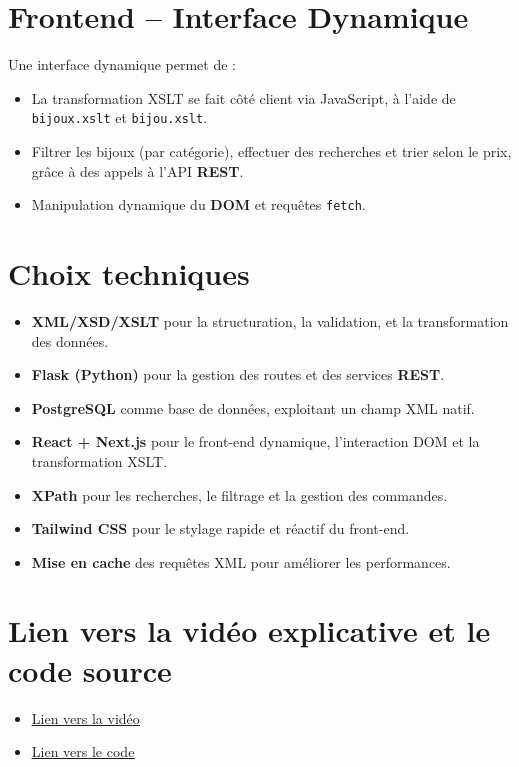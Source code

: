 \documentclass[14pt]{extarticle}
\begin{document}
\section*{Frontend – Interface Dynamique}
Une interface dynamique permet de :
\begin{itemize}[label=-]
    \item La transformation XSLT se fait côté client via JavaScript, à l’aide de \texttt{bijoux.xslt} et \texttt{bijou.xslt}.
    \item Filtrer les bijoux (par catégorie), effectuer des recherches et trier selon le prix, grâce à des appels à l’API \textbf{REST}.
    \item Manipulation dynamique du \textbf{DOM} et requêtes \texttt{fetch}.
\end{itemize}
\section*{Choix techniques}
\begin{itemize} [label =-]
    \item \textbf{XML/XSD/XSLT} pour la structuration, la validation, et la transformation des données.
    \item \textbf{Flask (Python)} pour la gestion des routes et des services \textbf{REST}.
    \item \textbf{PostgreSQL} comme base de données, exploitant un champ XML natif.
    \item \textbf{React + Next.js} pour le front-end dynamique, l’interaction DOM et la transformation XSLT.
     \item \textbf{XPath} pour les recherches, le filtrage et la gestion des commandes.
     \item \textbf{Tailwind CSS} pour le stylage rapide et réactif du front-end.
     \item \textbf{Mise en cache} des requêtes XML pour améliorer les performances.
\end{itemize}
\section*{ Lien vers la vidéo explicative et le code source}
\begin{itemize}[label= ]
    \item\href{https://drive.google.com/file/d/1js70yp9zMGgbiwFzuWCpGEhvx22dAf4N/view?usp=share_link}{\uline{Lien vers la vidéo}}
    \item \href{https://github.com/ikrammedj/Verron-Jewelry}{\uline{Lien vers le code}}

    
\end{itemize}









    
\end{document}
